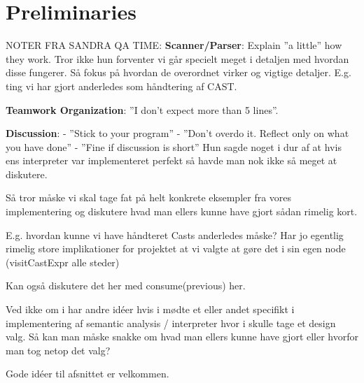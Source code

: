 \section{Preliminaries}

NOTER FRA SANDRA QA TIME:
\textbf{Scanner/Parser}:
Explain ''a little'' how they work. Tror ikke hun forventer vi går specielt
meget i detaljen med hvordan disse fungerer. Så fokus på hvordan de overordnet
virker og vigtige detaljer. E.g. ting vi har gjort anderledes som håndtering af CAST.

\textbf{Teamwork Organization}:
''I don't expect more than 5 lines''.

\textbf{Discussion}:
- ''Stick to your program''
- ''Don't overdo it. Reflect only on what you have done''
- ''Fine if discussion is short''
Hun sagde noget i dur af at hvis ens interpreter var implementeret perfekt
så havde man nok ikke så meget at diskutere.

Så tror måske vi skal tage fat på helt konkrete eksempler fra vores implementering
og diskutere hvad man ellers kunne have gjort sådan rimelig kort.

E.g. hvordan kunne vi have håndteret Casts anderledes måske?
Har jo egentlig rimelig store implikationer for projektet
at vi valgte at gøre det i sin egen node (visitCastExpr alle steder)

Kan også diskutere det her med consume(previous) her.

Ved ikke om i har andre idéer hvis i mødte et eller andet specifikt
i implementering af semantic analysis / interpreter hvor i skulle
tage et design valg. Så kan man måske snakke om hvad man ellers kunne
have gjort eller hvorfor man tog netop det valg?

Gode idéer til afsnittet er velkommen.




